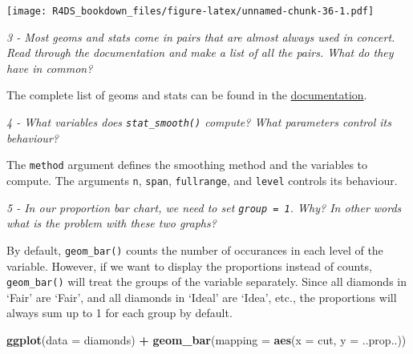 \documentclass[]{article}
\newenvironment{Shaded}{\begin{snugshade}}{\end{snugshade}}
\newcommand{\KeywordTok}[1]{\textcolor[rgb]{0.13,0.29,0.53}{\textbf{#1}}}
\newcommand{\DataTypeTok}[1]{\textcolor[rgb]{0.13,0.29,0.53}{#1}}
\newcommand{\StringTok}[1]{\textcolor[rgb]{0.31,0.60,0.02}{#1}}
\newcommand{\OperatorTok}[1]{\textcolor[rgb]{0.81,0.36,0.00}{\textbf{#1}}}
\newcommand{\NormalTok}[1]{#1}
\theoremstyle{definition}
\theoremstyle{definition}
\theoremstyle{definition}
\theoremstyle{remark}
\begin{document}
\begin{Shaded}
\end{Shaded}

\texttt{[image: R4DS\_bookdown\_files/figure-latex/unnamed-chunk-36-1.pdf]}

\emph{3 - Most geoms and stats come in pairs that are almost always used
in concert. Read through the documentation and make a list of all the
pairs. What do they have in common?}

The complete list of geoms and stats can be found in the
\href{http://ggplot2.tidyverse.org/reference/}{documentation}.

\emph{4 - What variables does \texttt{stat\_smooth()} compute? What
parameters control its behaviour?}

The \texttt{method} argument defines the smoothing method and the
variables to compute. The arguments \texttt{n}, \texttt{span},
\texttt{fullrange}, and \texttt{level} controls its behaviour.

\emph{5 - In our proportion bar chart, we need to set
\texttt{group\ =\ 1}. Why? In other words what is the problem with these
two graphs?}

By default, \texttt{geom\_bar()} counts the number of occurances in each
level of the variable. However, if we want to display the proportions
instead of counts, \texttt{geom\_bar()} will treat the groups of the
variable separately. Since all diamonds in `Fair' are `Fair', and all
diamonds in `Ideal' are `Idea', etc., the proportions will always sum up
to 1 for each group by default.

\begin{Shaded}
\begin{Highlighting}[]
\KeywordTok{ggplot}\NormalTok{(}\DataTypeTok{data =}\NormalTok{ diamonds) }\OperatorTok{+}\StringTok{ }
\StringTok{  }\KeywordTok{geom_bar}\NormalTok{(}\DataTypeTok{mapping =} \KeywordTok{aes}\NormalTok{(}\DataTypeTok{x =}\NormalTok{ cut, }\DataTypeTok{y =}\NormalTok{ ..prop..))}
\end{Highlighting}
\end{Shaded}
\end{document}
